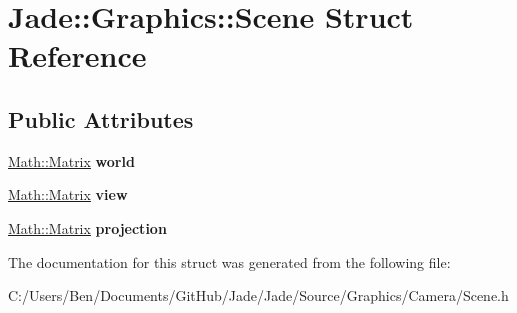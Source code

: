 \hypertarget{struct_jade_1_1_graphics_1_1_scene}{}\section{Jade\+:\+:Graphics\+:\+:Scene Struct Reference}
\label{struct_jade_1_1_graphics_1_1_scene}
\subsection*{Public Attributes}
\begin{DoxyCompactItemize}
\item 
\hypertarget{struct_jade_1_1_graphics_1_1_scene_aba036f6dbe5d84342041aca724d5c59a}{}\hyperlink{struct_jade_1_1_math_1_1_matrix}{Math\+::\+Matrix} {\bfseries world}\label{struct_jade_1_1_graphics_1_1_scene_aba036f6dbe5d84342041aca724d5c59a}

\item 
\hypertarget{struct_jade_1_1_graphics_1_1_scene_a13a9c70856f9a99daae11f28525069ed}{}\hyperlink{struct_jade_1_1_math_1_1_matrix}{Math\+::\+Matrix} {\bfseries view}\label{struct_jade_1_1_graphics_1_1_scene_a13a9c70856f9a99daae11f28525069ed}

\item 
\hypertarget{struct_jade_1_1_graphics_1_1_scene_a1243f86f96d2743fed4ffc029b8530eb}{}\hyperlink{struct_jade_1_1_math_1_1_matrix}{Math\+::\+Matrix} {\bfseries projection}\label{struct_jade_1_1_graphics_1_1_scene_a1243f86f96d2743fed4ffc029b8530eb}

\end{DoxyCompactItemize}


The documentation for this struct was generated from the following file\+:\begin{DoxyCompactItemize}
\item 
C\+:/\+Users/\+Ben/\+Documents/\+Git\+Hub/\+Jade/\+Jade/\+Source/\+Graphics/\+Camera/Scene.\+h\end{DoxyCompactItemize}
